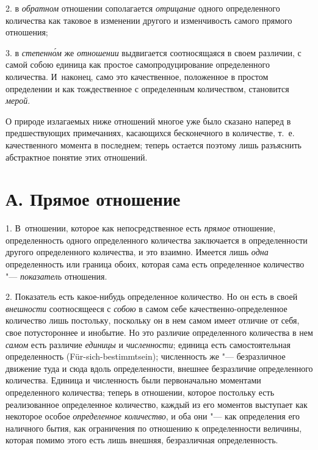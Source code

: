 2. в {\em обратном} отношении сополагается
{\em отрицание} одного определенного количества как
таковое в изменении другого и изменчивость самого прямого отношения;

3. в {\em степенн\'{о}м} же
{\em отношении} выдвигается соотносящаяся в своем
различии, с самой собою единица как простое самопродуцирование
определенного количества. И~наконец, само это качественное, положенное в
простом определении и как тождественное с определенным количеством,
становится {\em мерой}.

О природе излагаемых ниже отношений многое уже было сказано наперед в
предшествующих примечаниях, касающихся бесконечного в количестве, т.~е.
качественного момента в последнем; теперь остается поэтому лишь разъяснить
абстрактное понятие этих отношений.

\section[А. Прямое отношение]{А. Прямое отношение}
1. В~отношении, которое как непосредственное есть
{\em прямое} отношение, определенность одного
определенного количества заключается в определенности другого определенного
количества, и это взаимно. Имеется лишь {\em одна}
определенность или граница обоих, которая сама есть определенное количество
"--- {\em показатель} отношения.

2. Показатель есть какое-нибудь определенное количество. Но он есть в своей
{\em внешности} соотносящееся с
{\em собою} в самом себе качественно-определенное
количество лишь постольку, поскольку он в нем самом имеет отличие от себя,
свое потустороннее и инобытие. Но это различие определенного количества в
нем {\em самом} есть различие
{\em единицы} и {\em численности};
единица есть самостоятельная определенность (Für-sich-bestimmtsein);
численность же "--- безразличное движение туда и сюда вдоль определенности,
внешнее безразличие определенного количества. Единица и численность были
первоначально моментами определенного количества; теперь в отношении,
которое постольку есть реализованное определенное количество, каждый из его
моментов выступает как некоторое особое
{\em определенное количество}, и оба они "--- как
определения его наличного бытия, как ограничения по отношению к
определенности величины, которая помимо этого есть лишь внешняя,
безразличная определенность.

